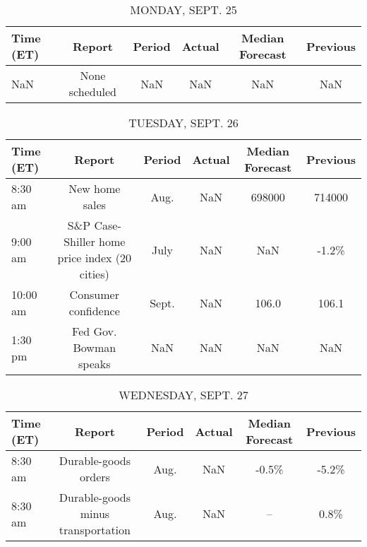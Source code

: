 \documentclass{article}%
\begin{document}
%
\normalsize%


\begin{table}[htbp]%
\caption{MONDAY, SEPT. 25}%
\centering%
\begin{adjustbox}{width=1\textwidth}%
\begin{tabular}{lccccc}
\toprule
Time (ET) &         Report & Period & Actual & Median Forecast & Previous \\
\midrule
      NaN & None scheduled &    NaN &    NaN &             NaN &      NaN \\
\bottomrule
\end{tabular}
%
\end{adjustbox}%
\end{table}

%


\begin{table}[htbp]%
\caption{TUESDAY, SEPT. 26}%
\centering%
\begin{adjustbox}{width=1\textwidth}%
\begin{tabular}{lccccc}
\toprule
Time (ET) &                                        Report & Period & Actual & Median Forecast & Previous \\
\midrule
  8:30 am &                                New home sales &   Aug. &    NaN &          698000 &   714000 \\
  9:00 am & S\&P Case-Shiller home price index (20 cities) &   July &    NaN &             NaN &    -1.2\% \\
 10:00 am &                           Consumer confidence &  Sept. &    NaN &           106.0 &    106.1 \\
  1:30 pm &                        Fed Gov. Bowman speaks &    NaN &    NaN &             NaN &      NaN \\
\bottomrule
\end{tabular}
%
\end{adjustbox}%
\end{table}

%


\begin{table}[htbp]%
\caption{WEDNESDAY, SEPT. 27}%
\centering%
\begin{adjustbox}{width=1\textwidth}%
\begin{tabular}{lccccc}
\toprule
Time (ET) &                             Report & Period & Actual & Median Forecast & Previous \\
\midrule
  8:30 am &               Durable-goods orders &   Aug. &    NaN &           -0.5\% &    -5.2\% \\
  8:30 am & Durable-goods minus transportation &   Aug. &    NaN &              -- &     0.8\% \\
\bottomrule
\end{tabular}
%
\end{adjustbox}%
\end{table}
\end{document}
